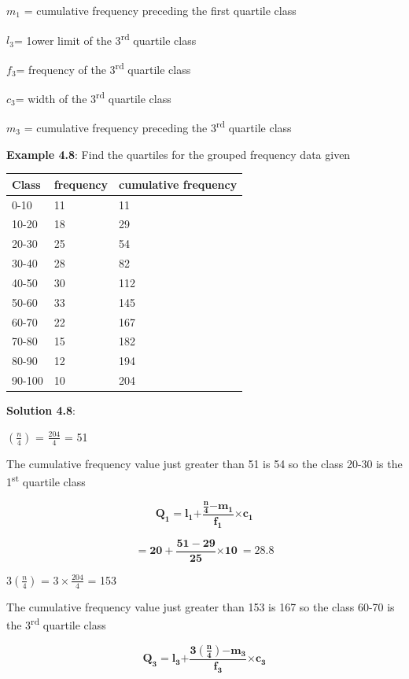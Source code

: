 \documentclass[
]{book}
\begin{document}
\(m_{1}\) = cumulative frequency preceding the first quartile class

\(l_{3}\)= 1ower limit of the 3\textsuperscript{rd} quartile class

\(f_{3}\)= frequency of the 3\textsuperscript{rd} quartile class

\(c_{3}\)= width of the 3\textsuperscript{rd} quartile class

\(m_{3}\) = cumulative frequency preceding the 3\textsuperscript{rd} quartile class

\textbf{Example 4.8}: Find the quartiles for the grouped frequency data given

\begin{longtable}[]{@{}lll@{}}
\toprule
\textbf{Class} & \textbf{frequency} & \textbf{cumulative frequency} \\
\midrule
\endhead
0-10 & 11 & 11 \\
10-20 & 18 & 29 \\
20-30 & 25 & 54 \\
30-40 & 28 & 82 \\
40-50 & 30 & 112 \\
50-60 & 33 & 145 \\
60-70 & 22 & 167 \\
70-80 & 15 & 182 \\
80-90 & 12 & 194 \\
90-100 & 10 & 204 \\
\bottomrule
\end{longtable}

\textbf{Solution 4.8}:

\(\left( \frac{n}{4} \right)\) = \(\frac{204}{4}\) = 51

The cumulative frequency value just greater than 51 is 54 so the class
20-30 is the 1\textsuperscript{st} quartile class

\[\mathbf{Q}_{\mathbf{1}}\mathbf{=}\mathbf{l}_{\mathbf{1}}\mathbf{+}\frac{\frac{\mathbf{n}}{\mathbf{4}}\mathbf{-}\mathbf{m}_{\mathbf{1}}}{\mathbf{f}_{\mathbf{1}}}\mathbf{\times}\mathbf{c}_{\mathbf{1}}\]

\[\mathbf{= 20 +}\frac{\mathbf{51 - 29}}{\mathbf{25}}\mathbf{\times 10\  = 28.8}\]

\(3\left( \frac{n}{4} \right)\) = \(3 \times \frac{204}{4}\) = 153

The cumulative frequency value just greater than 153 is 167 so the class
60-70 is the 3\textsuperscript{rd} quartile class

\[\mathbf{Q}_{\mathbf{3}}\mathbf{=}\mathbf{l}_{\mathbf{3}}\mathbf{+}\frac{\mathbf{3}\left( \frac{\mathbf{n}}{\mathbf{4}} \right)\mathbf{-}\mathbf{m}_{\mathbf{3}}}{\mathbf{f}_{\mathbf{3}}}\mathbf{\times}\mathbf{c}_{\mathbf{3}}\]
\end{document}
